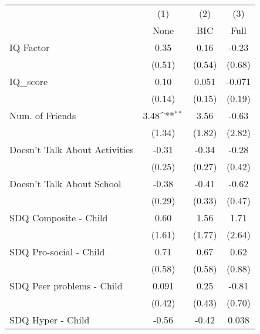 {
\def\sym#1{\ifmmode^{#1}\else\(^{#1}\)\fi}
\begin{tabular}{l*{3}{c}}
\toprule
            &\multicolumn{1}{c}{(1)}&\multicolumn{1}{c}{(2)}&\multicolumn{1}{c}{(3)}\\
            &\multicolumn{1}{c}{None}&\multicolumn{1}{c}{BIC}&\multicolumn{1}{c}{Full}\\
\midrule
IQ Factor   &        0.35         &        0.16         &       -0.23         \\
            &      (0.51)         &      (0.54)         &      (0.68)         \\
\addlinespace
IQ\_score    &        0.10         &       0.051         &      -0.071         \\
            &      (0.14)         &      (0.15)         &      (0.19)         \\
\addlinespace
Num. of Friends&        3.48\sym{**} &        3.56         &       -0.63         \\
            &      (1.34)         &      (1.82)         &      (2.82)         \\
\addlinespace
Doesn't Talk About Activities&       -0.31         &       -0.34         &       -0.28         \\
            &      (0.25)         &      (0.27)         &      (0.42)         \\
\addlinespace
Doesn't Talk About School&       -0.38         &       -0.41         &       -0.62         \\
            &      (0.29)         &      (0.33)         &      (0.47)         \\
\addlinespace
SDQ Composite - Child&        0.60         &        1.56         &        1.71         \\
            &      (1.61)         &      (1.77)         &      (2.64)         \\
\addlinespace
SDQ Pro-social - Child&        0.71         &        0.67         &        0.62         \\
            &      (0.58)         &      (0.58)         &      (0.88)         \\
\addlinespace
SDQ Peer problems - Child&       0.091         &        0.25         &       -0.81         \\
            &      (0.42)         &      (0.43)         &      (0.70)         \\
\addlinespace
SDQ Hyper - Child&       -0.56         &       -0.42         &       0.038         \\

\end{tabular}}
